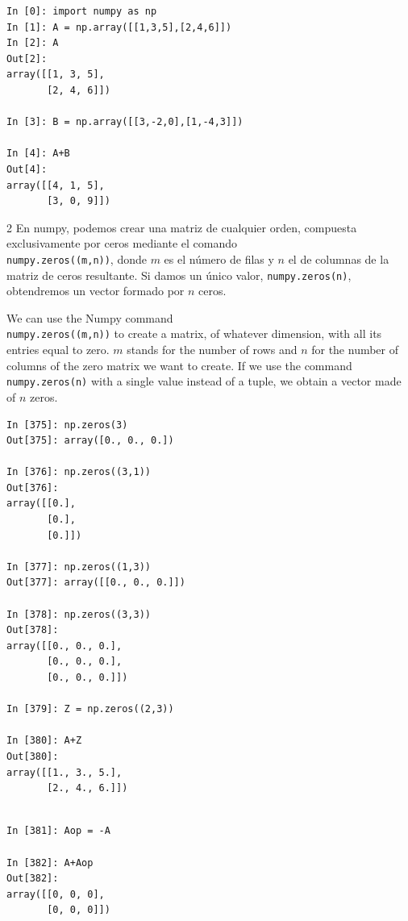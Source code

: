 \begin{center}
    \begin{minipage}{.5\textwidth}
    \begin{verbatim}
In [0]: import numpy as np
In [1]: A = np.array([[1,3,5],[2,4,6]])
In [2]: A
Out[2]: 
array([[1, 3, 5],
       [2, 4, 6]])

In [3]: B = np.array([[3,-2,0],[1,-4,3]])

In [4]: A+B
Out[4]: 
array([[4, 1, 5],
       [3, 0, 9]])

    \end{verbatim}
        
    \end{minipage}
\end{center}
\begin{paracol}{2}
En numpy, podemos crear una matriz de cualquier orden, compuesta exclusivamente por ceros mediante el comando\\ \texttt{numpy.zeros((m,n))}, donde $m$ es el número de filas y $n$ el de columnas de la matriz de ceros resultante. Si damos un único valor, \texttt{numpy.zeros(n)}, obtendremos un vector formado por $n$ ceros.

\switchcolumn
We can use the Numpy command\\ \texttt{numpy.zeros((m,n))} to create a matrix, of whatever dimension, with all its entries equal to zero. $m$ stands for the number of rows and $n$ for the number of columns of the zero matrix we want to create. If we use the command \texttt{numpy.zeros(n)} with a single value instead of a tuple, we obtain a vector made of $n$ zeros.  
\end{paracol}
\begin{center}
    \begin{minipage}{.3\textwidth}
        \begin{verbatim}
In [375]: np.zeros(3)
Out[375]: array([0., 0., 0.])

In [376]: np.zeros((3,1))
Out[376]: 
array([[0.],
       [0.],
       [0.]])

In [377]: np.zeros((1,3))
Out[377]: array([[0., 0., 0.]])

In [378]: np.zeros((3,3))
Out[378]: 
array([[0., 0., 0.],
       [0., 0., 0.],
       [0., 0., 0.]])
       
In [379]: Z = np.zeros((2,3))

In [380]: A+Z
Out[380]: 
array([[1., 3., 5.],
       [2., 4., 6.]])
\end{verbatim}
    \end{minipage}
\end{center}
\begin{center}
    \begin{minipage}{.3\textwidth}
        \begin{verbatim}       

In [381]: Aop = -A

In [382]: A+Aop
Out[382]: 
array([[0, 0, 0],
       [0, 0, 0]])
        \end{verbatim}
    \end{minipage}
\end{center}

